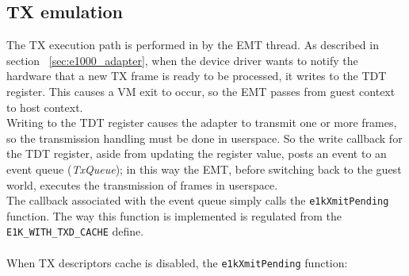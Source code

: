 \documentclass[a4paper, 12pt, titlepage]{report}
\begin{document}
\subsection{TX emulation}
The TX execution path is performed in by the EMT thread. As described in section ~\ref{sec:e1000_adapter}, when the device driver wants to notify the hardware that a new TX frame is ready to be processed, it writes to the TDT register. This causes a VM exit to occur, so the EMT passes from guest context to host context.
\\
Writing to the TDT register causes the adapter to transmit one or more frames, so the transmission handling must be done in userspace. So the write callback for the TDT register, aside from updating the register value, posts an event to an event queue (\textit{TxQueue}); in this way the EMT, before switching back to the guest world, executes the transmission of frames in userspace.
\\
The callback associated with the event queue simply calls the \texttt{e1kXmitPending} function. The way this function is implemented is regulated from the \texttt{E1K\_WITH\_TXD\_CACHE} define.
\\
\\ 
When TX descriptors cache is disabled, the \texttt{e1kXmitPending} function:
\end{document}

